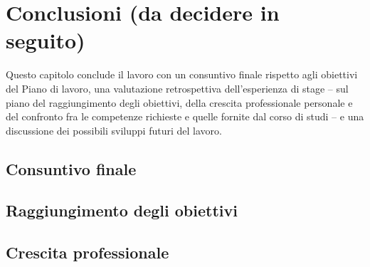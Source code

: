 \chapter{Conclusioni (da decidere in seguito)}
\label{chap:conclusioni}

Questo capitolo conclude il lavoro con un consuntivo finale rispetto agli obiettivi del Piano di lavoro, una valutazione retrospettiva dell'esperienza di stage -- sul piano del raggiungimento degli obiettivi, della crescita professionale personale e del confronto fra le competenze richieste e quelle fornite dal corso di studi -- e una discussione dei possibili sviluppi futuri del lavoro.

\section{Consuntivo finale}
\label{sec:consuntivo-finale}




\section{Raggiungimento degli obiettivi}
\label{sec:raggiungimento-obiettivi}




\section{Crescita professionale}
\label{sec:crescita-professionale}


